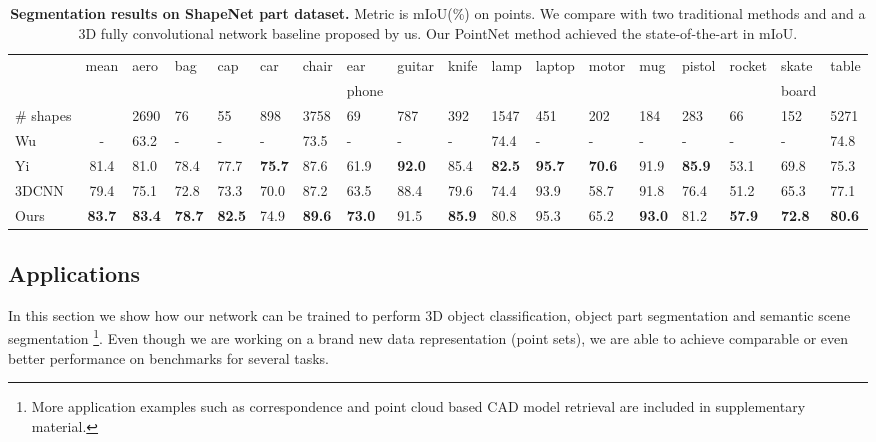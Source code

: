 \documentclass[10pt,twocolumn,letterpaper]{article}
\begin{document}
\begin{table*}[th!]
    \small
    \centering
    \begin{tabular}[width=\linewidth]{l|c|p{0.5cm}p{0.4cm}p{0.4cm}p{0.4cm}p{0.5cm}p{0.6cm}p{0.5cm}p{0.5cm}p{0.5cm}p{0.6cm}p{0.6cm}p{0.3cm}p{0.5cm}p{0.6cm}p{0.6cm}p{0.6cm}}
    \hline
    ~        & mean & aero & bag & cap & car & chair & ear & guitar & knife & lamp & laptop & motor & mug & pistol & rocket & skate & table \\ 
    &   & &  &  &  &  & phone &  &   &  &  & &    &    &    & board &  \\ \hline
    \# shapes & & 2690 & 76 & 55 & 898 & 3758 & 69 & 787 & 392 & 1547 & 451 & 202 & 184 & 283 & 66 & 152 & 5271 \\ \hline
    Wu~\cite{Wu2014248} &  -  & 63.2  & - &      -    & -   & 73.5 & - &    - &    - &     74.4  & -    & - &   -   &   -   &   - & -  &  74.8 \\
    Yi~\cite{Yi16} & 81.4 & 81.0 & 78.4 & 77.7 & \textbf{75.7} & 87.6 & 61.9 & \textbf{92.0} & 85.4 & \textbf{82.5} & \textbf{95.7} & \textbf{70.6} & 91.9 & \textbf{85.9} & 53.1 & 69.8 & 75.3 \\ \hline
    3DCNN & 79.4 & 75.1 & 72.8 & 73.3 & 70.0 & 87.2 & 63.5 & 88.4 & 79.6 & 74.4 & 93.9 & 58.7 & 91.8 & 76.4 & 51.2 & 65.3 & 77.1 \\ 
    Ours & \textbf{83.7} & \textbf{83.4} & \textbf{78.7} & \textbf{82.5} & 74.9 & \textbf{89.6} & \textbf{73.0} & 91.5 & \textbf{85.9} & 80.8 & 95.3 & 65.2 & \textbf{93.0} & 81.2 & \textbf{57.9} & \textbf{72.8} & \textbf{80.6} \\ \hline
    \end{tabular}
    \caption{\textbf{Segmentation results on ShapeNet part dataset.} Metric is mIoU(\%) on points. We compare with two traditional methods \cite{Wu2014248} and \cite{Yi16} and a 3D fully convolutional network baseline proposed by us. Our PointNet method achieved the state-of-the-art in mIoU.}
\label{tab:segmentation}
\end{table*}



\subsection{Applications}
\label{sec:application}
In this section we show how our network can be trained to perform 3D object classification, object part segmentation and semantic scene segmentation  \footnote{More application examples such as correspondence and point cloud based CAD model retrieval are included in supplementary material.}. Even though we are working on a brand new data representation (point sets), we are able to achieve comparable or even better performance on benchmarks for several tasks.
\end{document}
